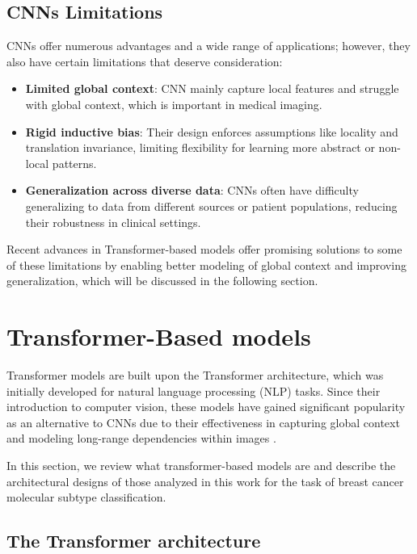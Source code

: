 \documentclass[a4paper,10pt]{book}
\begin{document}
\subsection{CNNs Limitations}

CNNs offer numerous advantages and a wide range of applications; however, they also have certain limitations that deserve consideration:

\begin{itemize}
    \item \textbf{Limited global context}: CNN mainly capture local features and struggle with global context, which is important in medical imaging.
    
    \item \textbf{Rigid inductive bias}: Their design enforces assumptions like locality and translation invariance, limiting flexibility for learning more abstract or non-local patterns.
    
    \item \textbf{Generalization across diverse data}: CNNs often have difficulty generalizing to data from different sources or patient populations, reducing their robustness in clinical settings.
\end{itemize}

Recent advances in Transformer-based models offer promising solutions to some of these limitations by enabling better modeling of global context and improving generalization, which will be discussed in the following section.

\section{Transformer-Based models}

Transformer models are built upon the Transformer architecture, which was initially developed for natural language processing (NLP) tasks. Since their introduction to computer vision, these models have gained significant popularity as an alternative to CNNs due to their effectiveness in capturing global context and modeling long-range dependencies within images \cite{pereira_review_2024}. 

In this section, we review what transformer-based models are and describe the architectural designs of those analyzed in this work for the task of breast cancer molecular subtype classification.

\subsection{The Transformer architecture}
\end{document}
